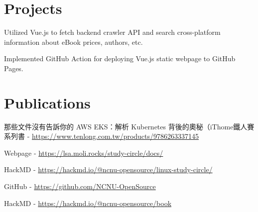 \documentclass[]{deedy-resume-openfont}
\begin{document}
\begin{minipage}[t]{1\textwidth}
\section{Projects}

\null\hfill{}
\begin{tightemize}
    \item Utilized Vue.js to fetch backend crawler API and search cross-platform information about eBook prices, authors, etc.
    \item Implemented GitHub Action for deploying Vue.js static webpage to GitHub Pages.
\end{tightemize}
\hspace{12pt}

\section{Publications}

\null\hfill{}
\begin{tightemize}
    \item 那些文件沒有告訴你的 AWS EKS：解析 Kubernetes 背後的奧秘（iThome鐵人賽系列書 - \href{https://www.tenlong.com.tw/products/9786263337145}{https://www.tenlong.com.tw/products/9786263337145}
\end{tightemize}
\sectionsep

\null\hfill{}
\begin{tightemize}
    \item Webpage - \href{https://lsa.moli.rocks/study-circle/docs/}{https://lsa.moli.rocks/study-circle/docs/}
    \item HackMD - \href{https://hackmd.io/@ncnu-opensource/linux-study-circle/}{https://hackmd.io/@ncnu-opensource/linux-study-circle/}
\end{tightemize}
\sectionsep

\null\hfill{}
\begin{tightemize}
    \item GitHub - \href{https://github.com/NCNU-OpenSource}{https://github.com/NCNU-OpenSource}
    \item HackMD - \href{https://hackmd.io/@ncnu-opensource/book}{https://hackmd.io/@ncnu-opensource/book}
\end{tightemize}


\end{minipage}
\end{document}
